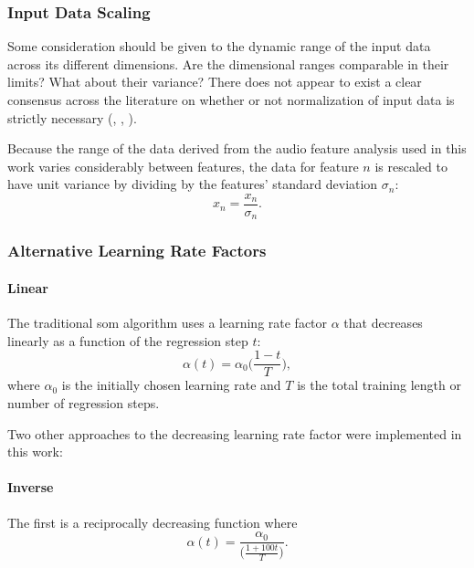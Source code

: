 \subsubsection{Input Data Scaling}
\label{subsubsec:som_input_normalization}
Some consideration should be given to the dynamic range of the input data across
its different dimensions. Are the dimensional ranges comparable in their limits?
What about their variance? There does not appear to exist a clear consensus
across the literature on whether or not normalization of input data is strictly
necessary (\citet[p.34]{vesanto2000}, \citet[p.1470]{kohonen1990},
\citet{web:kohonen2007}).

Because the range of the data derived from the audio
feature analysis used in this work varies considerably between features, the
data for feature $n$ is rescaled to have unit variance by dividing by the
features' standard deviation $\sigma_n$:
\begin{equation}
  x_{n} = \frac{x_{n}}{\sigma_n}.
\end{equation}

\subsubsection{Alternative Learning Rate Factors}
\label{subsubsec:som_learning_rates}

\paragraph*{Linear}
\label{para:alpha_linear}
The traditional \gls{som} algorithm uses a learning rate factor $\alpha$ that
decreases linearly as a function of the regression step $t$:
\begin{equation}
  \alpha(t) = \alpha_0 \bigg(\frac{1 - t}{T}\bigg),
\end{equation}
where $\alpha_0$ is the initially chosen learning rate and $T$ is the total
training length or number of regression steps.
\bigskip

Two other approaches to the decreasing learning rate factor were implemented
in this work:

\paragraph*{Inverse}
\label{para:alpha_inverse}
The first is a reciprocally decreasing function where
\begin{equation}
  \alpha(t) = \frac{\alpha_0}{\big(\frac{1 + 100t}{T}\big)}.
\end{equation}

